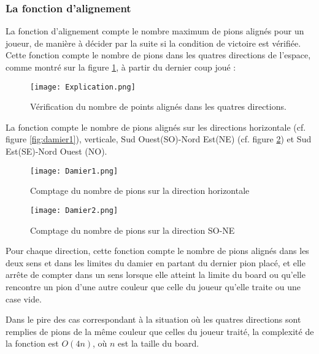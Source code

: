 \documentclass[12pt]{article}
\begin{document}
\subsubsection{La fonction d'alignement}

La fonction d'alignement compte le nombre maximum de pions alignés pour un joueur, de manière à décider par la suite si la condition de victoire est vérifiée. Cette fonction compte le nombre de pions dans les quatres directions de l'espace, comme montré sur la figure \ref{fig:directon_damier}, à partir du dernier coup joué :

\begin{figure}[H]
\centering
\texttt{[image: Explication.png]}
\caption{Vérification du nombre de points alignés dans les quatres directions.}
\label{fig:directon_damier}
\end{figure}

La fonction compte le nombre de pions alignés sur les directions horizontale (cf. figure \ref{fig:damier1}), verticale, Sud Ouest(SO)-Nord Est(NE) (cf. figure \ref{fig:damier2}) et Sud Est(SE)-Nord Ouest (NO).

\begin{figure}[H]
    \centering
     \begin{minipage}[c]{.46\linewidth}
        \centering
        \texttt{[image: Damier1.png]}
        \caption{Comptage du nombre de pions sur la direction horizontale}
        \label{fig:damier1}
    \end{minipage} \hfill
     \begin{minipage}[c]{.46\linewidth}
        \centering
        \texttt{[image: Damier2.png]}
        \caption{Comptage du nombre de pions sur la direction SO-NE}
        \label{fig:damier2}
    \end{minipage} \hfill
\end{figure}

Pour chaque direction, cette fonction compte le nombre de pions alignés dans les deux sens et dans les limites du damier en partant du dernier pion placé, et elle arrête de compter dans un sens lorsque elle atteint la limite du board ou qu'elle rencontre un pion d'une autre couleur que celle du joueur qu'elle traite ou une case vide.

Dans le pire des cas correspondant à la situation où les quatres directions sont remplies de pions de la même couleur que celles du joueur traité, la complexité de la fonction est $O(4n)$, où $n$ est la taille du board.
\end{document}

